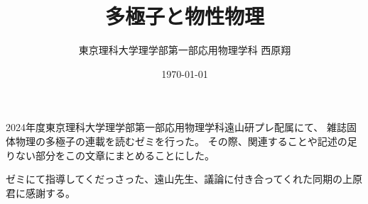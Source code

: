 \documentclass[11pt,dvipdfmx,a4paper]{jsreport}
\title{多極子と物性物理}
\author{東京理科大学理学部第一部応用物理学科 西原翔}
\date{\today}
\begin{document}

\maketitle
\tableofcontents

2024年度東京理科大学理学部第一部応用物理学科遠山研プレ配属にて、
雑誌固体物理の多極子の連載を読むゼミを行った。
その際、関連することや記述の足りない部分をこの文章にまとめることにした。

ゼミにて指導してくだっさった、遠山先生、議論に付き合ってくれた同期の上原君に感謝する。

\clearpage





\end{document}
